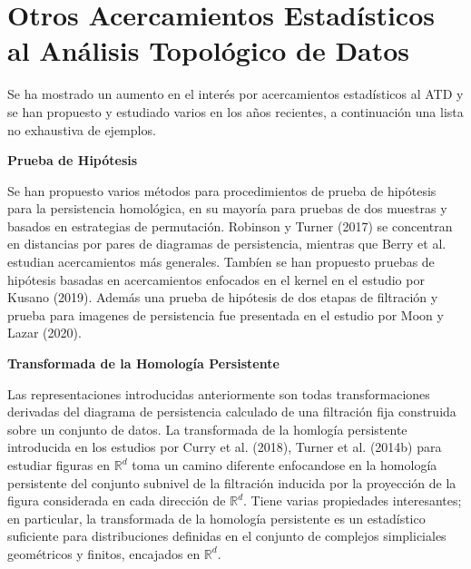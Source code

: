 \section{Otros Acercamientos Estad\'isticos al An\'alisis Topol\'ogico de Datos}

Se ha mostrado un aumento en el inter\'es por acercamientos estad\'isticos al ATD
y se han propuesto y estudiado varios en los a\~{n}os recientes, a continuaci\'on
una lista no exhaustiva de ejemplos.

\textbf{\large Prueba de Hip\'otesis}

Se han propuesto varios m\'etodos para procedimientos de prueba de hip\'otesis
para la persistencia homol\'ogica, en su mayor\'ia para pruebas de dos muestras y
basados en estrategias de permutaci\'on.
Robinson y Turner (2017)\cite{Robinson2017} se concentran en distancias por pares
de diagramas de persistencia, mientras que Berry et al. \cite{Berry2020}
estudian acercamientos m\'as generales.
Tamb\'ien se han propuesto pruebas de hip\'otesis basadas en
acercamientos enfocados en el kernel en el estudio por Kusano (2019)\cite{Kusano2019}.
Adem\'as una prueba de hip\'otesis de dos etapas de filtraci\'on y prueba para imagenes de
persistencia fue presentada en el estudio por
Moon y Lazar (2020)\cite{Moon2020}.\medbreak\medbreak

\textbf{\large Transformada de la Homolog\'ia Persistente}

Las representaciones introducidas anteriormente son todas transformaciones derivadas
del diagrama de persistencia calculado de una filtraci\'on fija construida sobre
un conjunto de datos.
La transformada de la homlog\'ia persistente introducida en los estudios por
Curry et al. (2018)\cite{Curry2018}, Turner et al. (2014b)\cite{Turner2014b}
para estudiar figuras en $\mathbb{R}^{d}$
toma un camino diferente enfocandose en la homolog\'ia persistente del
conjunto subnivel de la filtraci\'on inducida por la proyecci\'on de la figura
considerada en cada direcci\'on de $\mathbb{R}^{d}$.
Tiene varias propiedades interesantes; en particular, la transformada de la
homolog\'ia persistente es un estad\'istico suficiente para distribuciones definidas en
el conjunto de complejos simpliciales geom\'etricos y finitos, encajados en $\mathbb{R}^{d}$.
